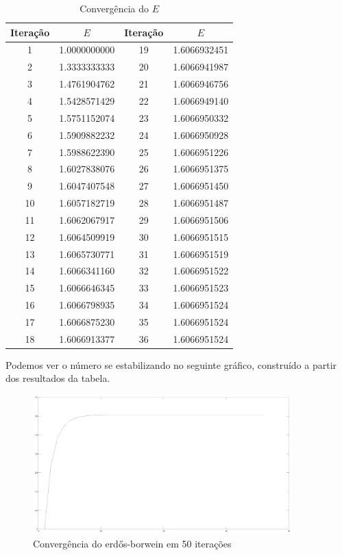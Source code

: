 \documentclass[a4paper]{article}
\begin{document}
\begin{table}[H]
	\centering
	\begin{tabular}{|c|c|c|c|}
    	\hline
		Iteração & $E$ & Iteração & $E$ \\
    	\hline
		1 & 1.0000000000 & 19 & 1.6066932451 \\
    	\hline
		2 & 1.3333333333 & 20 & 1.6066941987 \\
    	\hline
		3 & 1.4761904762 & 21 & 1.6066946756 \\
    	\hline
		4 & 1.5428571429 & 22 & 1.6066949140 \\
    	\hline
		5 & 1.5751152074 & 23 & 1.6066950332 \\
    	\hline
		6 & 1.5909882232 & 24 & 1.6066950928 \\
    	\hline
		7 & 1.5988622390 & 25 & 1.6066951226 \\
    	\hline
		8 & 1.6027838076 & 26 & 1.6066951375 \\
    	\hline
		9 & 1.6047407548 & 27 & 1.6066951450 \\
    	\hline
		10 & 1.6057182719 & 28 & 1.6066951487 \\
    	\hline
		11 & 1.6062067917 & 29 & 1.6066951506 \\
    	\hline
		12 & 1.6064509919 & 30 & 1.6066951515 \\
    	\hline
		13 & 1.6065730771 & 31 & 1.6066951519 \\
    	\hline
		14 & 1.6066341160 & 32 & 1.6066951522 \\
    	\hline
		15 & 1.6066646345 & 33 & 1.6066951523 \\
    	\hline
		16 & 1.6066798935 & 34 & 1.6066951524 \\
    	\hline
		17 & 1.6066875230 & 35 & 1.6066951524 \\
    	\hline
		18 & 1.6066913377 & 36 & 1.6066951524 \\
    	\hline
	\end{tabular}
	\label{erdos_table}
	\caption{Convergência do $E$}
\end{table}

Podemos ver o número se estabilizando no seguinte gráfico, construído a partir
dos resultados da tabela.

\begin{figure}[H]
    \centering
    \includegraphics[width=100mm]{erdos.png}
    \caption{Convergência do erdős-borwein em 50 iterações}
	\label{erdos_graphic}
\end{figure}
\end{document}
